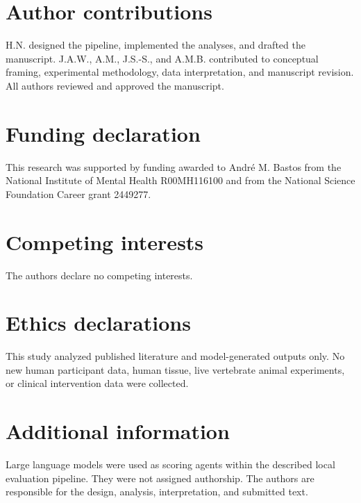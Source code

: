 \documentclass[12pt]{article}
\begin{document}
\section*{Author contributions}\label{author-contributions}
H.N. designed the pipeline, implemented the analyses, and drafted the manuscript. J.A.W., A.M., J.S.-S., and A.M.B. contributed to conceptual framing, experimental methodology, data interpretation, and manuscript revision. All authors reviewed and approved the manuscript.

\section*{Funding declaration}\label{}
This research was supported by funding awarded to André M. Bastos from the National Institute of Mental Health R00MH116100 and from the National Science Foundation Career grant 2449277.

\section*{Competing interests}\label{competing-interests}
The authors declare no competing interests.

\section*{Ethics declarations}\label{ethics-declarations}
This study analyzed published literature and model-generated outputs only. No new human participant data, human tissue, live vertebrate animal experiments, or clinical intervention data were collected.

\section*{Additional information}\label{additional-information}
Large language models were used as scoring agents within the described local evaluation pipeline. They were not assigned authorship. The authors are responsible for the design, analysis, interpretation, and submitted text.
\end{document}
